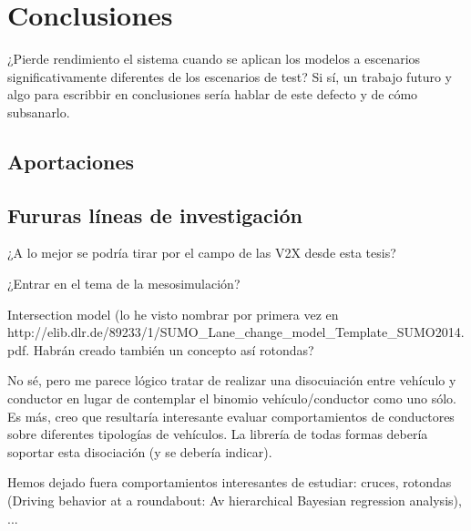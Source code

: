 \chapter{Conclusiones}
\label{ch:conclusions}

¿Pierde rendimiento el sistema cuando se aplican los modelos a escenarios significativamente diferentes de los escenarios de test? Si sí, un trabajo futuro y algo para escribbir en conclusiones sería hablar de este defecto y de cómo subsanarlo.

\section{Aportaciones}
\label{ch:conclusions:contributions}

\section{Fururas líneas de investigación}
\label{ch:conclusions:future-work}

¿A lo mejor se podría tirar por el campo de las V2X desde esta tesis?

¿Entrar en el tema de la mesosimulación?

Intersection model (lo he visto nombrar por primera vez en http://elib.dlr.de/89233/1/SUMO\_Lane\_change\_model\_Template\_SUMO2014.pdf. Habrán creado también un concepto así rotondas?

No sé, pero me parece lógico tratar de realizar una disocuiación entre vehículo y conductor en lugar de contemplar el binomio vehículo/conductor como uno sólo. Es más, creo que resultaría interesante evaluar comportamientos de conductores sobre diferentes tipologías de vehículos. La librería de todas formas debería soportar esta disociación (y se debería indicar).

Hemos dejado fuera comportamientos interesantes de estudiar: cruces, rotondas (Driving behavior at a roundabout: Av hierarchical Bayesian regression analysis), ...